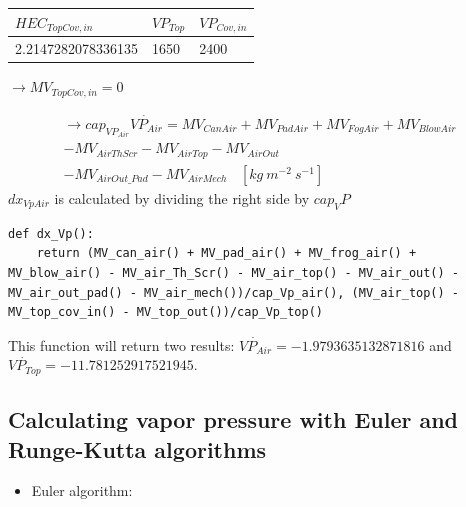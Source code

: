 \documentclass[a4paper]{article}
\numberwithin{equation}{section}
\begin{document}
\begin{table}[H]
\centering
\begin{tabular}{|l|l|l|}
\hline
\rowcolor[HTML]{FFFC9E}
\cellcolor[HTML]{FFFC9E}\textbf{$HEC_{TopCov,in}$} &
 \cellcolor[HTML]{FFFC9E}\textbf{$VP_{Top}$}& \cellcolor[HTML]{FFFC9E}\textbf{$VP_{Cov,in}$}\\ \hline
2.2147282078336135            &  1650              & 2400                         \\ \hline
\end{tabular}
\end{table}
$\rightarrow MV_{TopCov,in} = 0$

\begin{multline*}
  \rightarrow cap_{VP_{Air}}\dot{VP_{Air}} = MV_{CanAir} + MV_{PadAir} + MV_{FogAir} + MV_{BlowAir} \\
  - MV_{AirThScr} - MV_{AirTop} - MV_{AirOut} \\
  - MV_{AirOut\_Pad} - MV_{AirMech} ~~~~ [kg\ m^{-2}\ s^{-1}]
\end{multline*}
$dx_{VpAir}$ is calculated by dividing the right side by $cap_VP$
\begin{mdframed}[leftline=false,rightline=false,backgroundcolor=cyan!10]
  \begin{verbatim}
def dx_Vp():
    return (MV_can_air() + MV_pad_air() + MV_frog_air() + MV_blow_air() - MV_air_Th_Scr() - MV_air_top() - MV_air_out() - MV_air_out_pad() - MV_air_mech())/cap_Vp_air(), (MV_air_top() - MV_top_cov_in() - MV_top_out())/cap_Vp_top()
\end{verbatim}
\end{mdframed}
 This function will return two results: \(\dot{VP_{Air}} = -1.9793635132871816\) and \(\dot{VP_{Top}} = -11.781252917521945.\)\\

\subsection{Calculating vapor pressure with Euler and Runge-Kutta algorithms}

\begin{itemize}
    \item Euler algorithm:
\end{itemize}
\end{document}
